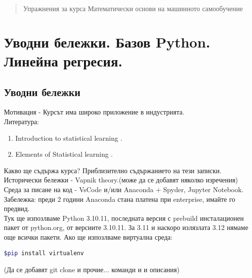 \documentclass{article}
\begin{document}
	\newpage
	\date{}
	\maketitle

	\begin{abstract}
		Упражнения за курса Математически основи на машинното самообучение
	\end{abstract}
	
	\tableofcontents
		


\section{Уводни бележки. Базов Python. Линейна регресия.}
	\subsection{Уводни бележки}
	Мотивация - Курсът има широко приложение в индустрията.\\	
	Литература:
	\begin{enumerate}
	\item  Introduction to statistical learning \cite{james2023introduction}.
	\item  Elements of Statistical learning  \cite{hastie01statisticallearning}.
	\end{enumerate}
	
	\noindent
	Какво ще съдържа курса? Приблизително съдържанието на тези записки. \\
	
	\noindent
	Исторически бележки - Vapnik theory.(може да се добавят няколко изречения) \\

	\noindent	
	Среда за писане на код - VsCode и/или Anaconda + Spyder, Jupyter Notebook. \\
 	Забележка: преди 2 години Anaconda стана платена при enterprise, имайте го предвид.\\
 	Тук ще изпозлваме Python 3.10.11, последната версия с prebuild инсталационен пакет от python.org,
 	от версиите 3.10.11. За 3.11 и наскоро излязлата 3.12 нямаме още всички пакети. Ако ще изпозлваме виртуална среда: 	
 	\begin{lstlisting}[language=bash]
$pip install virtualenv
 	\end{lstlisting}
 	(Да се добавят git clone и прочие... команди и и описания) \\
 	
\end{document}
